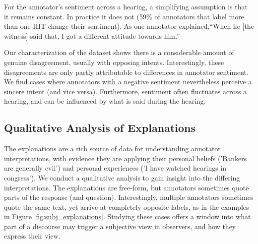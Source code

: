 
For the annotator's sentiment across a hearing, a simplifying assumption is that it remains constant. In practice it does not (59\% of annotators that label more than one HIT change their sentiment). 
As one annotator explained,``When he [the witness] said that, I got a different attitude towards him.'' 

Our characterization of the dataset shows there is a considerable amount of genuine disagreement, usually with opposing intents. Interestingly, these disagreements are only partly attributable to differences in annotator sentiment. We find cases where annotators with a negative sentiment nevertheless perceive a sincere intent (and vice versa). Furthermore, sentiment often fluctuates across a hearing, and can be influenced by what is said during the hearing.

\subsection{Qualitative Analysis of Explanations}
The explanations are a rich source of data for understanding annotator interpretations, with evidence they are applying their personal beliefs ('Bankers are generally evil') and personal experiences ('I have watched hearings in congress'). We conduct a qualitative analysis to gain insight into the differing interpretations.  The explanations are free-form, but annotators sometimes quote parts of the response (and question). Interestingly, multiple annotators sometimes quote the same text, yet arrive at completely opposite labels, as in the examples in Figure \ref{fig:subj_explanations}. Studying these cases offers a window into what part of a discourse may trigger a subjective view in observers, and how they express their view. 


